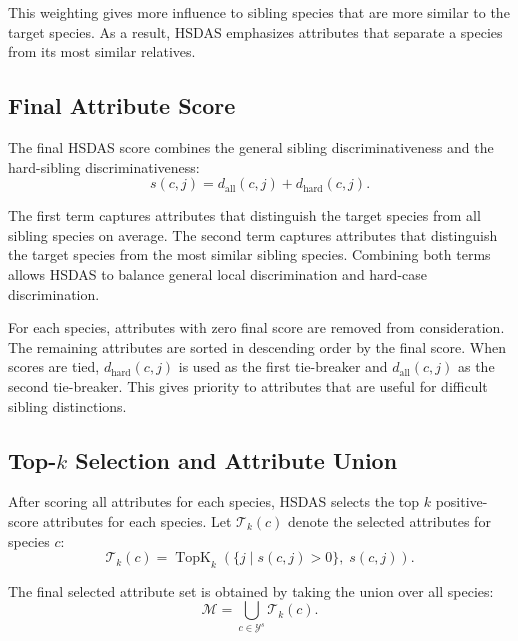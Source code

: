 This weighting gives more influence to sibling species that are more similar to the target species. As a result, HSDAS emphasizes attributes that separate a species from its most similar relatives.

\subsection{Final Attribute Score}

The final HSDAS score combines the general sibling discriminativeness and the hard-sibling discriminativeness:
\begin{equation}
    s(c,j)
    =
    d_{\mathrm{all}}(c,j)
    +
    d_{\mathrm{hard}}(c,j).
\end{equation}

The first term captures attributes that distinguish the target species from all sibling species on average. The second term captures attributes that distinguish the target species from the most similar sibling species. Combining both terms allows HSDAS to balance general local discrimination and hard-case discrimination.

For each species, attributes with zero final score are removed from consideration. The remaining attributes are sorted in descending order by the final score. When scores are tied, \(d_{\mathrm{hard}}(c,j)\) is used as the first tie-breaker and \(d_{\mathrm{all}}(c,j)\) as the second tie-breaker. This gives priority to attributes that are useful for difficult sibling distinctions.

\subsection{Top-\(k\) Selection and Attribute Union}

After scoring all attributes for each species, HSDAS selects the top \(k\) positive-score attributes for each species. Let \(\mathcal{T}_k(c)\) denote the selected attributes for species \(c\):
\begin{equation}
   \mathcal{T}_k(c)
    =
    \operatorname{TopK}_{k}
    \left(
    \{j \mid s(c,j) > 0\},\; s(c,j)
    \right).
\end{equation}

The final selected attribute set is obtained by taking the union over all species:
\begin{equation}
    \mathcal{M}
    =
    \bigcup_{c \in \mathcal{Y}^{s}}
    \mathcal{T}_k(c).
\end{equation}

